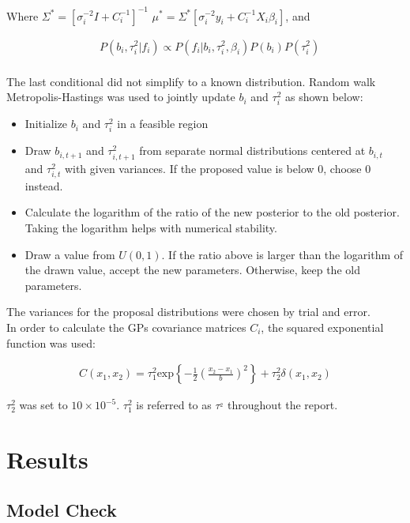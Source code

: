 \documentclass[paper=a4, fontsize=11pt]{scrartcl}
\begin{document}
Where  $\Sigma^*=[\sigma_i^{-2}I + C_i^{-1}]^{-1} $ $\mu^*=\Sigma^*[\sigma_i^{-2}y_i + C_i^{-1}X_i\beta_i]$, and

\begin{align*}
     & P(b_i,\tau_i^2 | f_i)  \propto P(f_i|b_i, \tau_i^2, \beta_i)P(b_i)P(\tau_i^2) \\
\end{align*}

The last conditional  did not simplify to a known distribution. Random walk Metropolis-Hastings was used to jointly update $b_i$ and $\tau_i^2$ as shown below:

\begin{itemize}
    \item Initialize $b_i$ and $\tau_i^2$ in a feasible region
    \item Draw $b_{i, t+1}$ and $\tau^2_{i, t+1}$ from separate normal distributions centered at  $b_{i, t}$ and $\tau^2_{i, t}$ with given variances. If the proposed value is below 0, choose 0 instead. 
    \item Calculate the logarithm of the ratio of the 
    new posterior to the old posterior. Taking the logarithm helps with numerical stability.
    \item Draw a value from $U(0,1)$. If the ratio above is larger than the logarithm of the drawn value, accept the new parameters. Otherwise, keep the old parameters.
\end{itemize}

The variances for the proposal distributions were chosen by trial and error.\\


In order to calculate the GPs covariance matrices $C_i$, the squared exponential function was used:

\begin{align*}
    C(x_1, x_2) = \tau_1^2 \mbox{exp} \left\{-\frac{1}{2} \left( \frac{x_2 - x_1}{b}\right)^2 \right\} + \tau_2^2  \delta(x_1, x_2)
\end{align*}

$\tau^2_2$ was set to $10 \times 10^{-5}$. $\tau^2_1$ is referred to as $\tau^_2$ throughout the report.

\section{Results}

\subsection{Model Check}
\end{document}
